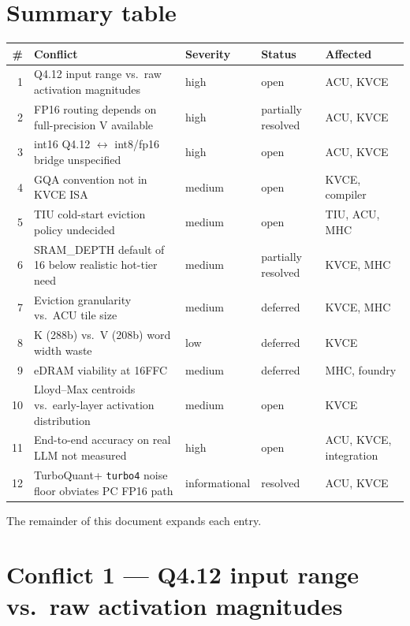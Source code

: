 \documentclass[11pt]{article}
\begin{document}
\section{Summary table}

\begin{center}
\renewcommand{\arraystretch}{1.2}
\setlength{\tabcolsep}{4pt}
\begin{tabular}{@{}rp{}lll@{}}
\toprule
\textbf{\#} & \textbf{Conflict} & \textbf{Severity} & \textbf{Status} & \textbf{Affected} \\
\midrule
1 & Q4.12 input range vs.\ raw activation magnitudes
  & high   & open & ACU, KVCE \\
2 & FP16 routing depends on full-precision V available
  & high   & partially resolved & ACU, KVCE \\
3 & int16 Q4.12 $\leftrightarrow$ int8/fp16 bridge unspecified
  & high   & open & ACU, KVCE \\
4 & GQA convention not in KVCE ISA
  & medium & open & KVCE, compiler \\
5 & TIU cold-start eviction policy undecided
  & medium & open & TIU, ACU, MHC \\
6 & SRAM\_DEPTH default of 16 below realistic hot-tier need
  & medium & partially resolved & KVCE, MHC \\
7 & Eviction granularity vs.\ ACU tile size
  & medium & deferred & KVCE, MHC \\
8 & K (288b) vs.\ V (208b) word width waste
  & low    & deferred & KVCE \\
9 & eDRAM viability at 16FFC
  & medium & deferred & MHC, foundry \\
10 & Lloyd--Max centroids vs.\ early-layer activation distribution
  & medium & open & KVCE \\
11 & End-to-end accuracy on real LLM not measured
  & high   & open & ACU, KVCE, integration \\
12 & TurboQuant+ \texttt{turbo4} noise floor obviates PC FP16 path
  & informational & resolved & ACU, KVCE \\
\bottomrule
\end{tabular}
\end{center}

The remainder of this document expands each entry.

\section{Conflict 1 --- Q4.12 input range vs.\ raw activation magnitudes}
\label{sec:c1}
\end{document}
